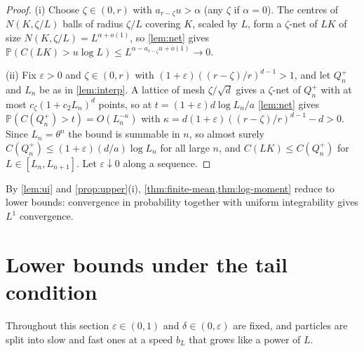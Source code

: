 \documentclass[11pt,a4paper]{article}
\numberwithin{equation}{section}
\theoremstyle{definition}
\theoremstyle{remark}
\newcommand{\Pp}{\mathbb P}
\begin{document}
\begin{proof}
(i) Choose $\zeta\in(0,r)$ with $a_{r-\zeta}u>\alpha$ (any $\zeta$ if
$\alpha=0$). The centres of $N(K,\zeta/L)$ balls of radius $\zeta/L$
covering $K$, scaled by $L$, form a $\zeta$-net of $LK$ of size
$N(K,\zeta/L)=L^{\alpha+o(1)}$, so \cref{lem:net} gives
$\Pp(C(LK)>u\log L)\le L^{\alpha-a_{r-\zeta}u+o(1)}\to0$.

(ii) Fix $\varepsilon>0$ and $\zeta\in(0,r)$ with
$(1+\varepsilon)((r-\zeta)/r)^{d-1}>1$, and let $Q_n^+$ and $L_n$ be as in
\cref{lem:interp}. A lattice of mesh $\zeta/\sqrt d$ gives a $\zeta$-net of
$Q_n^+$ with at most $c_\zeta(1+c_2L_n)^d$ points, so at
$t=(1+\varepsilon)d\log L_n/a$ \cref{lem:net} gives
$\Pp(C(Q_n^+)>t)=O(L_n^{-\kappa})$ with
$\kappa=d(1+\varepsilon)((r-\zeta)/r)^{d-1}-d>0$. Since $L_n=\theta^n$ the
bound is summable in $n$, so almost surely
$C(Q_n^+)\le(1+\varepsilon)(d/a)\log L_n$ for all large $n$, and
$C(LK)\le C(Q_n^+)$ for $L\in[L_n,L_{n+1}]$. Let $\varepsilon\downarrow0$
along a sequence.
\end{proof}

By \cref{lem:ui} and \cref{prop:upper}(i), \cref{thm:finite-mean,thm:log-moment}
reduce to lower bounds: convergence in probability together with uniform
integrability gives $L^1$ convergence.

\section{Lower bounds under the tail condition}\label{sec:log}

Throughout this section $\varepsilon\in(0,1)$ and $\delta\in(0,\varepsilon)$
are fixed, and particles are split into slow and fast ones at a speed $b_L$
that grows like a power of $L$.
\end{document}
